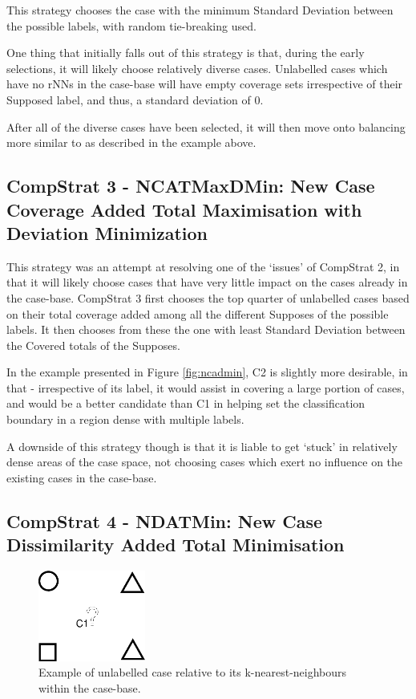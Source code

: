 \documentclass[a4paper,11pt]{report}
\begin{document}
\vspace{10pt}

This strategy chooses the case with the minimum Standard Deviation between the possible labels, with random tie-breaking used.

One thing that initially falls out of this strategy is that, during the early selections, it will likely choose relatively diverse cases. Unlabelled cases which have no rNNs in the case-base will have empty coverage sets irrespective of their Supposed label, and thus, a standard deviation of 0.

After all of the diverse cases have been selected, it will then move onto balancing more similar to as described in the example above.

\subsection{CompStrat 3 - NCATMaxDMin: New Case Coverage Added Total Maximisation with Deviation Minimization}
This strategy was an attempt at resolving one of the `issues' of CompStrat 2, in that it will likely choose cases that have very little impact on the cases already in the case-base.  CompStrat 3 first chooses the top quarter of unlabelled cases based on their total coverage added among all the different Supposes of the possible labels. It then chooses from these the one with least Standard Deviation between the Covered totals of the Supposes.

In the example presented in Figure \ref{fig:ncadmin}, C2 is slightly more desirable, in that - irrespective of its label, it would assist in covering a large portion of cases, and would be a better candidate than C1 in helping set the classification boundary in a region dense with multiple labels.

A downside of this strategy though is that it is liable to get `stuck' in relatively dense areas of the case space, not choosing cases which exert no influence on the existing cases in the case-base.

\subsection{CompStrat 4 - NDATMin: New Case Dissimilarity Added Total Minimisation}
\begin{figure}[h!] \centering
\includegraphics[width=100pt]{./Drawn/NDATMin}
\caption{Example of unlabelled case relative to its k-nearest-neighbours within the case-base.}
\label{fig:ndatmin}
\end{figure}
\end{document}
